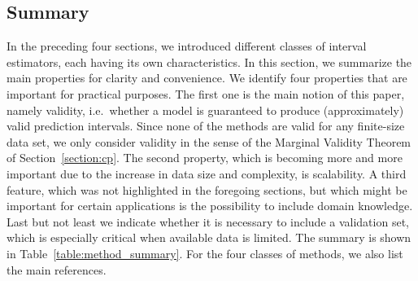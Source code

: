 \documentclass[smallcondensed]{svjour3}
\begin{document}
\subsection{Summary}

    In the preceding four sections, we introduced different classes of interval estimators, each having its own characteristics. In this section, we summarize the main properties for clarity and convenience. We identify four properties that are important for practical purposes. The first one is the main notion of this paper, namely validity, i.e.\ whether a model is guaranteed to produce (approximately) valid prediction intervals. Since none of the methods are valid for any finite-size data set, we only consider validity in the sense of the Marginal Validity Theorem of Section~\ref{section:cp}. The second property, which is becoming more and more important due to the increase in data size and complexity, is scalability. A third feature, which was not highlighted in the foregoing sections, but which might be important for certain applications is the possibility to include domain knowledge. Last but not least we indicate whether it is necessary to include a validation set, which is especially critical when available data is limited. The summary is shown in Table~\ref{table:method_summary}. For the four classes of methods, we also list the main references.
\end{document}
